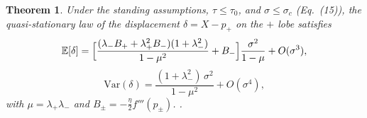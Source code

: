 \documentclass{article} %
\theoremstyle{plain}
\newtheorem{theorem}{Theorem}
\theoremstyle{definition}
\newtheorem{definition}{Definition}
\newcommand{\xbar}{\bar{x}}
\begin{document}
\begin{itemize}[nosep,leftmargin=*]
\begin{theorem}
Under the standing assumptions, $\tau \le \tau_0$, and $\sigma \le \sigma_c$
(Eq.~(15)), the quasi-stationary law of the displacement $\delta = X - p_+$ on
the $+$ lobe satisfies
\[
  \mathbb{E}[\delta]
    = \Bigl[\frac{(\lambda_- B_+ + \lambda_+^2 B_-)(1+\lambda_-^2)}{1-\mu^2}
      + B_-\Bigr]\frac{\sigma^2}{1-\mu} + O(\sigma^3),
\]
\[
  \mathrm{Var}(\delta)
    = \frac{(1+\lambda_-^2)\,\sigma^2}{1-\mu^2} + O(\sigma^4),
\]
with $\mu = \lambda_+\lambda_-$ and $B_\pm = -\tfrac{\eta}{2}f'''(p_\pm)$. .
\end{theorem}




\end{itemize}
\end{document}
